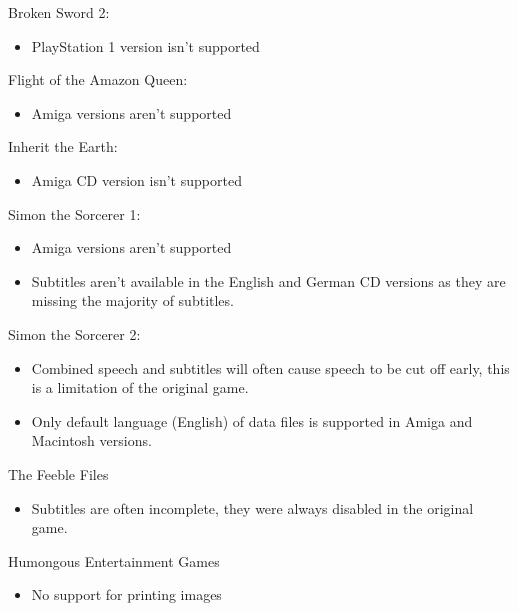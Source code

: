 Broken Sword 2:
  \begin{itemize}
  \item PlayStation 1 version isn't supported
  \end{itemize}
Flight of the Amazon Queen:
  \begin{itemize}
  \item Amiga versions aren't supported
  \end{itemize}
Inherit the Earth:
  \begin{itemize}
  \item Amiga CD version isn't supported
  \end{itemize}
Simon the Sorcerer 1:
  \begin{itemize}
  \item Amiga versions aren't supported
  \item Subtitles aren't available in the English and German CD versions
            as they are missing the majority of subtitles.
  \end{itemize}
Simon the Sorcerer 2:
  \begin{itemize}
  \item Combined speech and subtitles will often cause speech to be
            cut off early, this is a limitation of the original game.
  \item Only default language (English) of data files is supported
            in Amiga and Macintosh versions.
  \end{itemize}
The Feeble Files
  \begin{itemize}
  \item Subtitles are often incomplete, they were always disabled in the
            original game.
  \end{itemize}
Humongous Entertainment Games
  \begin{itemize}
  \item No support for printing images
  \end{itemize}
